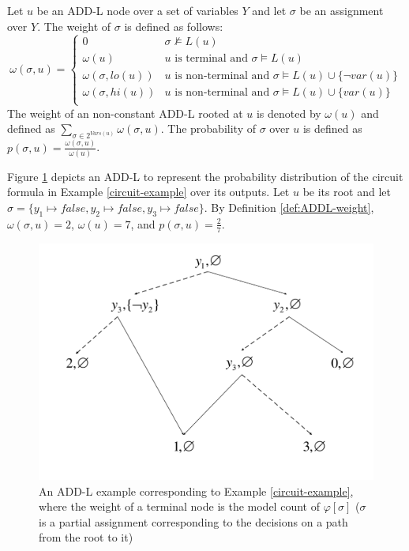 \begin{definition}\label{def:ADDL-weight}
	Let $u$ be an ADD-L node over a set of variables $Y$ and let $\sigma$ be an assignment over $Y$. 
    The weight of $\sigma$ is defined as follows:
	\begin{equation*}
	   \omega(\sigma,u) =  
	   \begin{cases}  
    	   0 & \sigma \not\models L(u) \\  
		   \omega(u) & \text{$u$ is terminal and $\sigma \models L(u)$} \\  
            \omega(\sigma,lo(u)) & \text{$u$ is non-terminal and $\sigma \models L(u) \cup \{\lnot \mathit{var}(u)\}$}  \\
            \omega(\sigma,hi(u)) & \text{$u$ is non-terminal and $\sigma \models L(u) \cup \{\mathit{var}(u)\}$}  \\
	   \end{cases}  
	\end{equation*}
    The weight of an non-constant ADD-L rooted at $u$ is denoted by $\omega(u)$ and defined as $\sum_{\sigma \in 2^{\mathit{Vars}(u)}}\omega(\sigma,u)$.
    The probability of $\sigma$ over $u$ is defined as $p(\sigma, u) = \frac{\omega(\sigma,u)}{\omega(u)}$.
\end{definition}

Figure \ref{fig:ADDL-example1} depicts an ADD-L to represent the probability distribution of the circuit formula in Example \ref{circuit-example} over its outputs.
Let $u$ be its root and let $\sigma = \{y_1 \mapsto \mathit{false}, y_2 \mapsto \mathit{false}, y_3 \mapsto \mathit{false}\}$.
By Definition \ref{def:ADDL-weight}, $\omega(\sigma, u) = 2$, $\omega(u) = 7$, and $p(\sigma, u) = \frac{2}{7}$.
\begin{figure}[!htbp]
	
	\centering
	\includegraphics[width=0.7\linewidth]{figures/ADD-L-example1.pdf}
	\caption{An ADD-L example corresponding to Example \ref{circuit-example}, where the weight of a terminal node is the model count of $\varphi[\sigma]$ ($\sigma$ is a partial assignment corresponding to the decisions on a path from the root to it)}
	\label{fig:ADDL-example1}
\end{figure}

